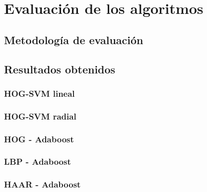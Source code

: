 
\chapter{Evaluación de los algoritmos}
\label{cap:eval}

\section{Metodología de evaluación}
\label{eval:metodologia}

\section{Resultados obtenidos}
\label{eval:resultados}

\subsection{HOG-SVM lineal}
\label{resultados:hogsvm}

\subsection{HOG-SVM radial}
\label{resultados:hogsvmkernel}

\subsection{HOG - Adaboost }
\label{resultados:hogboost}

\subsection{LBP - Adaboost}
\label{resultados:lbpboost}

\subsection{HAAR - Adaboost}
\label{resultados:haarboost}

